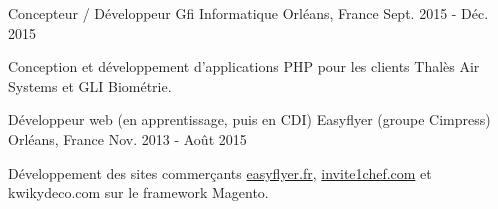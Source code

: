 \begin{cventries}
{\begin{cvitems}
      \end{cvitems}
    }
  \cventry
    {Concepteur / Développeur}
    {Gfi Informatique}
    {Orléans, France}
    {Sept. 2015 - Déc. 2015}
    {
      \begin{cvitems}
        \item {Conception et développement d'applications PHP pour les clients Thalès Air Systems et GLI Biométrie.}
      \end{cvitems}
    }
  \cventry
    {Développeur web (en apprentissage, puis en CDI)}
    {Easyflyer (groupe Cimpress)}
    {Orléans, France}
    {Nov. 2013 - Août 2015}
    {
      \begin{cvitems}
        \item {Développement des sites commerçants \href{https://www.easyflyer.fr}{easyflyer.fr}, \href{https://www.invite1chef.com}{invite1chef.com} et kwikydeco.com sur le framework Magento.}
      \end{cvitems}
    }
\end{cventries}
